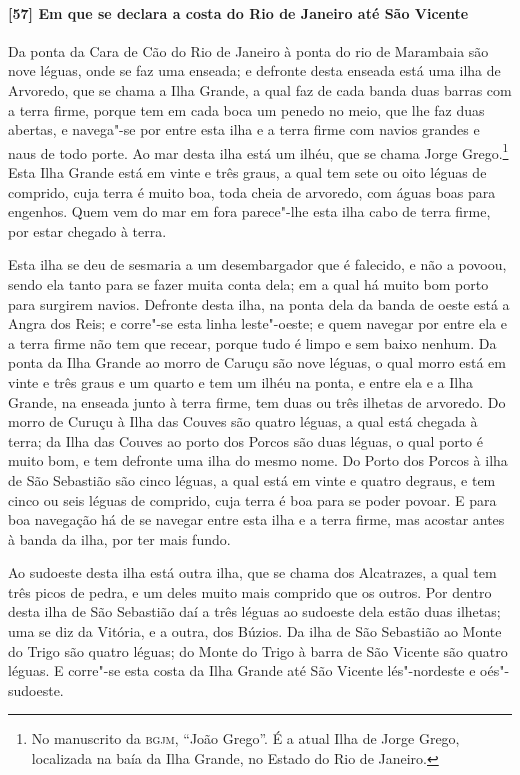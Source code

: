 \paragraph{[57] Em que se declara a costa do Rio de Janeiro até São Vicente} \quad
Da ponta da Cara de Cão do Rio de Janeiro à ponta do rio de Marambaia são nove léguas,
onde se faz uma enseada; e defronte desta enseada está uma ilha de Arvoredo, que se chama
a Ilha Grande, a qual faz de cada banda duas barras com a terra firme, porque tem em cada
boca um penedo no meio, que lhe faz duas abertas, e navega"-se por entre esta ilha e a
terra firme com navios grandes e naus de todo porte. Ao mar desta ilha está um ilhéu, que
se chama Jorge Grego.\footnote{ No manuscrito da \textsc{bgjm}, ``João Grego''. É a atual
Ilha de Jorge Grego, localizada na baía da Ilha Grande, no Estado do Rio de Janeiro.}
Esta Ilha Grande está em vinte e três graus, a qual tem sete ou oito léguas de comprido,
cuja terra é muito boa, toda cheia de arvoredo, com águas boas para engenhos. Quem vem do
mar em fora parece"-lhe esta ilha cabo de terra firme, por estar chegado à terra.

Esta ilha se deu de sesmaria a um desembargador que é falecido, e não a povoou, sendo ela
tanto para se fazer muita conta dela; em a qual há muito bom porto para surgirem navios.
Defronte desta ilha, na ponta dela da banda de oeste está a Angra dos Reis; e corre"-se
esta linha leste"-oeste; e quem navegar por entre ela e a terra firme não tem que recear,
porque tudo é limpo e sem baixo nenhum. Da ponta da Ilha Grande ao morro de Caruçu são
nove léguas, o qual morro está em vinte e três graus e um quarto e tem um ilhéu na ponta,
e entre ela e a Ilha Grande, na enseada junto à terra firme, tem duas ou três ilhetas de
arvoredo. Do morro de Curuçu à Ilha das Couves são quatro léguas, a qual está chegada à
terra; da Ilha das Couves ao porto dos Porcos são duas léguas, o qual porto é muito bom, e
tem defronte uma ilha do mesmo nome. Do Porto dos Porcos à ilha de São Sebastião são cinco
léguas, a qual está em vinte e quatro degraus, e tem cinco ou seis léguas de comprido,
cuja terra é boa para se poder povoar. E para boa navegação há de se navegar entre esta
ilha e a terra firme, mas acostar antes à banda da ilha, por ter mais fundo.

Ao sudoeste desta ilha está outra ilha, que se chama dos Alcatrazes, a qual tem três picos
de pedra, e um deles muito mais comprido que os outros. Por dentro desta ilha de São
Sebastião daí a três léguas ao sudoeste dela estão duas ilhetas; uma se diz da Vitória, e
a outra, dos Búzios. Da ilha de São Sebastião ao Monte do Trigo são quatro léguas; do
Monte do Trigo à barra de São Vicente são quatro léguas. E corre"-se esta costa da Ilha
Grande até São Vicente lés"-nordeste e oés"-sudoeste.

